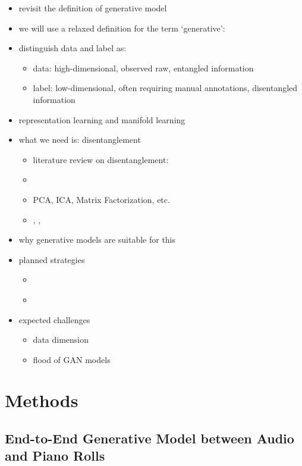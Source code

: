 
\begin{itemize}
	\item revisit the definition of generative model
	\item we will use a relaxed definition for the term `generative':
	\item distinguish data and label as:
	\begin{itemize}
		\item data: high-dimensional, observed raw, entangled information
		\item label: low-dimensional, often requiring manual annotations, disentangled information
	\end{itemize}
	\item representation learning and manifold learning
	\item what we need is: disentanglement
	\begin{itemize}
		\item literature review on disentanglement:
		\item \cite{brahma2016disentanglement}
		\item PCA, ICA, Matrix Factorization, etc.
		\item \cite{chen2016infogan}, \cite{achille2018information}, \cite{donahue2017gan}
	\end{itemize}
	\item why generative models are suitable for this
	\item planned strategies
	\begin{itemize}
		\item \cite{ganin2015domain}
		\item \cite{donahue2017gan}
	\end{itemize}
	\item expected challenges
	\begin{itemize}
		\item data dimension
		\item flood of GAN models
	\end{itemize}
\end{itemize}


\section{Methods}

\subsection{End-to-End Generative Model between Audio and Piano Rolls}

